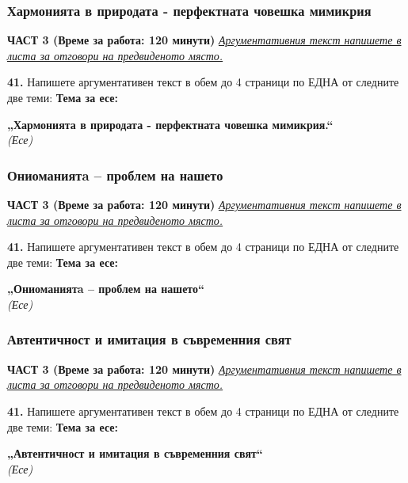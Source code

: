 \documentclass[12pt,a4paper]{article}
\begin{document}
\subsubsection{Хармонията в природата - перфектната човешка мимикрия}
\vspace{0.5cm}
\begin{center}
\textbf{ЧАСТ 3 (Време за работа: 120 минути)}
\vspace{0.2cm}
{\textit{\underline{Аргументативния текст напишете в листа за отговори на предвиденото място.}}}
\vspace{0.1cm}
\end{center}
\textbf{41.} Напишете аргументативен текст в обем до 4 страници по ЕДНА от следните две теми:
\vspace{0.2cm}
\textbf{Тема за есе:}
\vspace{0.1cm}
\begin{center}
\textbf{„Хармонията в природата - перфектната човешка мимикрия.“}
\\
\textit{(Есе)}
\end{center}

\subsubsection{Ониоманиятa – проблем на нашето}
\vspace{0.5cm}
\begin{center}
\textbf{ЧАСТ 3 (Време за работа: 120 минути)}
\vspace{0.2cm}
{\textit{\underline{Аргументативния текст напишете в листа за отговори на предвиденото място.}}}
\vspace{0.1cm}
\end{center}
\textbf{41.} Напишете аргументативен текст в обем до 4 страници по ЕДНА от следните две теми:
\vspace{0.2cm}
\textbf{Тема за есе:}
\vspace{0.1cm}
\begin{center}
\textbf{„Ониоманиятa – проблем на нашето“}
\\
\textit{(Есе)}
\end{center}

\subsubsection{Автентичност и имитация в съвременния свят}
\vspace{0.5cm}
\begin{center}
\textbf{ЧАСТ 3 (Време за работа: 120 минути)}
\vspace{0.2cm}
{\textit{\underline{Аргументативния текст напишете в листа за отговори на предвиденото място.}}}
\vspace{0.1cm}
\end{center}
\textbf{41.} Напишете аргументативен текст в обем до 4 страници по ЕДНА от следните две теми:
\vspace{0.2cm}
\textbf{Тема за есе:}
\vspace{0.1cm}
\begin{center}
\textbf{„Автентичност и имитация в съвременния свят“}
\\
\textit{(Есе)}
\end{center}
\end{document}
